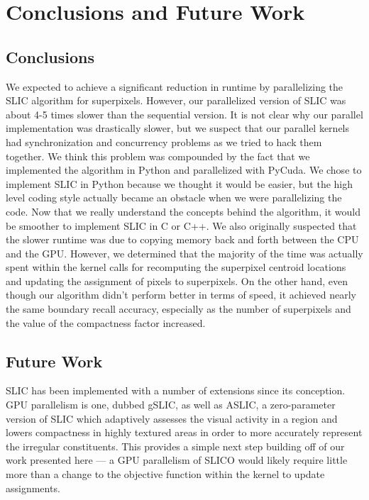 \documentclass[11pt,twocolumn]{article}
\begin{document}
\section{Conclusions and Future Work}\label{conc} 

\subsection{Conclusions}
We expected to achieve a significant reduction in runtime by parallelizing the SLIC algorithm for superpixels. However, our parallelized version of SLIC was about 4-5 times slower than the sequential version. It is not clear why our parallel implementation was drastically slower, but we suspect that our parallel kernels had synchronization and concurrency problems as we tried to hack them together. We think this problem was compounded by the fact that we implemented the algorithm in Python and parallelized with PyCuda. We chose to implement SLIC in Python because we thought it would be easier, but the high level coding style actually became an obstacle when we were parallelizing the code. Now that we really understand the concepts behind the algorithm, it would be smoother to implement SLIC in C or C++. We also originally suspected that the slower runtime was due to copying memory back and forth between the CPU and the GPU. However, we determined that the majority of the time was actually spent within the kernel calls for recomputing the superpixel centroid locations and updating the assignment of pixels to superpixels. On the other hand, even though our algorithm didn't perform better in terms of speed, it achieved nearly the same boundary recall accuracy, especially as the number of superpixels and the value of the compactness factor increased.
\subsection{Future Work}
SLIC has been implemented with a number of extensions since its conception. GPU parallelism is one, dubbed gSLIC, as well as ASLIC, a zero-parameter version of SLIC which adaptively assesses the visual activity in a region and lowers compactness in highly textured areas in order to more accurately represent the irregular constituents. This provides a simple next step building off of our work presented here --- a GPU parallelism of SLICO would likely require little more than a change to the objective function within the kernel to update assignments.
\end{document}
